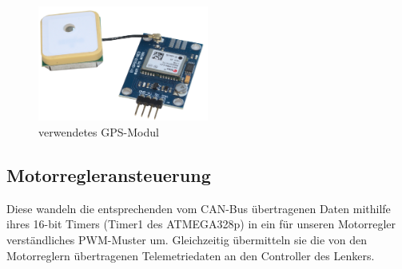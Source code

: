 \begin{figure}[h]
    \centering
    \includegraphics[width=0.5\textwidth]{Fotos/GPS_Modul.png}
    \caption{verwendetes GPS-Modul}
\end{figure}

\newpage
\subsection{Motorregleransteuerung}
Diese wandeln die entsprechenden vom CAN-Bus übertragenen Daten mithilfe ihres 16-bit Timers (Timer1 des ATMEGA328p) in ein für unseren Motorregler verständliches PWM-Muster um.
Gleichzeitig übermitteln sie die von den Motorreglern übertragenen Telemetriedaten an den Controller des Lenkers.

